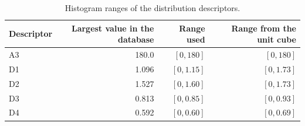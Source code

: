 \documentclass[10pt,a4paper]{article}
\begin{document}
\begin{table}[htbp]\centering\small
\begin{tabular}{@{}lrrr@{}}\toprule
Descriptor & Largest value in the database & Range used & Range from the unit cube\\\midrule
A3 & 180.0 & $[0,180]$ & $[0,180]$\\
D1 & 1.096 & $[0,1.15]$ & $[0,1.73]$\\
D2 & 1.527 & $[0,1.60]$ & $[0,1.73]$\\
D3 & 0.813 & $[0,0.85]$ & $[0,0.93]$\\
D4 & 0.592 & $[0,0.60]$ & $[0,0.69]$\\
\bottomrule\end{tabular}
\caption{Histogram ranges of the distribution descriptors.}
\label{tab:s32_ranges}
\end{table}
\end{document}
